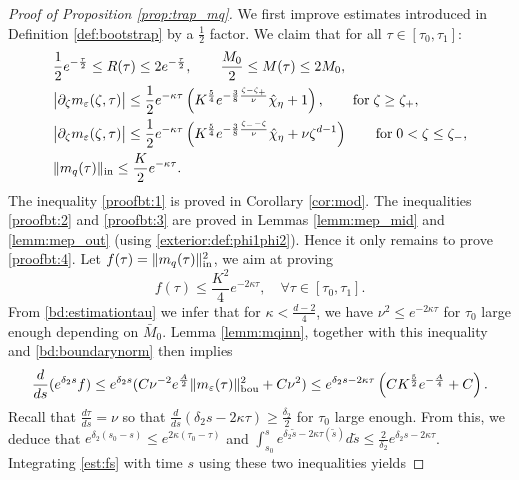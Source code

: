 \documentclass[11pt]{aims}
\theoremstyle{definition}
\newcommand{\ep}{\varepsilon}
\newcommand{\pa}{\partial}
\newcommand{\inn}{\textup{in}}
\newcommand{\bd}{\textup{bou}}
\newcommand{\be}{\begin{equation}}
\newcommand{\ee}{\end{equation}}
\numberwithin{equation}{section}
\begin{document}
\begin{proof}[Proof of Proposition \ref{prop:trap_mq}] We first improve estimates introduced in Definition \ref{def:bootstrap} by a $\frac 12 $ factor. We claim that for all $\tau \in [\tau_0, \tau_1]$:
\begin{align}
\label{proofbt:1}& \frac{1}{2} e^{-\frac{\tau}{2}}\leq R(\tau) \leq 2e^{-\frac{\tau}{2}}, \qquad \frac{M_0}{2}\leq M(\tau) \leq 2M_0,\\
\label{proofbt:2} & \big| \pa_\zeta m_\ep(\zeta, \tau)\big| \leq \frac{1}2 e^{-\kappa \tau} \left(K^{\frac{5}{4}} e^{-\frac 38 \frac{\zeta-\zeta_+}{\nu} }  \hat \chi_{\eta} + 1 \right), \qquad \textup{for}\; \zeta \geq \zeta_+, \\
\label{proofbt:3}& \big| \pa_\zeta m_\ep(\zeta, \tau)\big| \leq \frac{1}2 e^{-\kappa \tau} \left(K^\frac{5}{4} e^{-\frac{3}{8} \frac{ \zeta_--\zeta}{\nu} } \hat \chi_{\eta} +\nu \zeta^{d-1}  \right)  \qquad \textup{for}\; 0 < \zeta \leq \zeta_-,\\
\label{proofbt:4} & \|m_q(\tau) \|_\inn \leq \frac K2 e^{-\kappa \tau}.
\end{align}
The inequality \eqref{proofbt:1} is proved in Corollary \ref{cor:mod}. The inequalities \eqref{proofbt:2} and \eqref{proofbt:3} are proved in Lemmas \ref{lemm:mep_mid} and \ref{lemm:mep_out} (using \eqref{exterior:def:phi1phi2}). Hence it only remains to prove \eqref{proofbt:4}. Let $f(\tau) =\| m_q(\tau)\|_\inn^2$, we aim at proving
\begin{equation}\label{est:ftaus}
f(\tau) \leq \frac{K^2}{4} e^{-2\kappa \tau}, \quad \forall \tau \in [\tau_0, \tau_1].
\end{equation}
From \eqref{bd:estimationtau} we infer that for $\kappa<\frac{d-2}{4}$, we have $\nu^2\leq e^{-2\kappa \tau}$ for $\tau_0$ large enough depending on $\bar M_0$. Lemma \ref{lemm:mqinn}, together with this inequality and \eqref{bd:boundarynorm} then implies
\be \label{est:fs}
 \frac{d}{ds} (e^{\delta_2 s}f) \leq e^{\delta_2 s}(C\nu^{-2}e^{\frac A 2} \|  m_\varepsilon (\tau) \|_{\bd}^2 + C\nu^2)
\leq e^{\delta_2 s-2\kappa \tau}  \left(CK^\frac{5}{2}e^{-\frac A4} +C\right).
\ee
Recall that $\frac{d\tau}{ds} =\nu$ so that $\frac{d}{ds}(\delta_2 s-2\kappa \tau)\geq \frac{\delta_2}{2}$ for $\tau_0$ large enough. From this, we deduce that $e^{\delta_2(s_0-s)}\leq e^{2\kappa (\tau_0-\tau)}$ and $\int_{s_0}^s e^{\delta_2 \tilde s-2\kappa \tau(\tilde s)}d\tilde s \leq \frac{2}{\delta_2}e^{\delta_2 s-2\kappa \tau} $. Integrating \eqref{est:fs} with time $s$ using these two inequalities yields

\end{proof}
\end{document}
